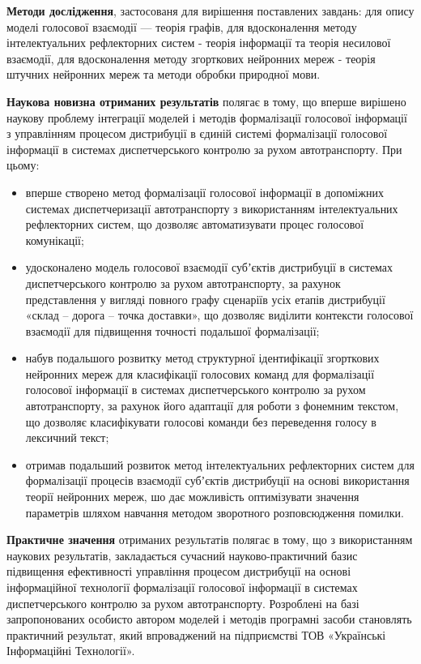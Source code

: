\textbf{Методи дослідження}, застосованя для вирішення поставлених завдань: для опису моделі голосової взаємодії — теорія графів, для вдосконалення методу інтелектуальних рефлекторних систем - теорія інформації та теорія несилової взаємодії, для вдосконалення методу згорткових нейронних мереж - теорія штучних нейронних мереж та методи обробки природної мови.

\textbf{Наукова новизна отриманих результатів} полягає в тому, що вперше вирішено наукову проблему інтеграції моделей і методів формалізації голосової інформації з управлінням процесом дистрибуції в єдиній системі формалізації голосової інформації в системах диспетчерського контролю за рухом автотранспорту. При цьому:

\begin{itemize}
	\item вперше створено метод формалізації голосової інформації в допоміжних системах диспетчеризації автотранспорту з використанням інтелектуальних рефлекторних систем, що дозволяє автоматизувати процес голосової комунікації;
	\item удосконалено модель голосової взаємодії субʼєктів дистрибуції в системах диспетчерського контролю за рухом автотранспорту, за рахунок представлення у вигляді повного графу сценаріїв усіх етапів дистрибуції «склад – дорога – точка доставки», що дозволяє виділити контексти голосової взаємодії для підвищення точності подальшої формалізації;
	\item набув подальшого розвитку метод структурної ідентифікації згорткових нейронних мереж для класифікації голосових команд для формалізації голосової інформації в системах диспетчерського контролю за рухом автотранспорту, за рахунок його адаптації для роботи з фонемним текстом, що дозволяє класифікувати голосові команди без переведення голосу в лексичний текст;
	\item отримав подальший розвиток метод інтелектуальних рефлекторних систем для формалізації процесів взаємодії субʼєктів дистрибуції на основі використання теорії нейронних мереж, шо дає можливість оптимізувати значення параметрів шляхом навчання методом зворотного розповсюдження помилки.
\end{itemize}

\textbf{Практичне значення} отриманих результатів полягає в тому, що з використанням наукових результатів, закладається сучасний науково-практичний базис підвищення ефективності управління процесом дистрибуції на основі інформаційної технології формалізації голосової інформації в системах диспетчерського контролю за рухом автотранспорту. Розроблені на базі запропонованих особисто автором моделей і методів програмні засоби становлять практичний результат, який впроваджений на підприємстві ТОВ «Українські Інформаційні Технології».

